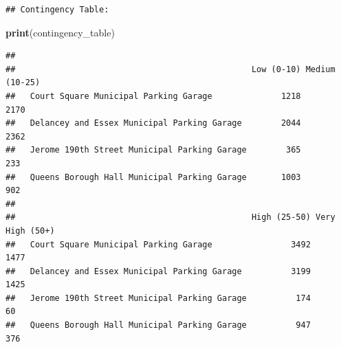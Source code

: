 \documentclass[
  12pt,
]{article}
\newenvironment{Shaded}{\begin{snugshade}}{\end{snugshade}}
\newcommand{\FunctionTok}[1]{\textcolor[rgb]{0.13,0.29,0.53}{\textbf{#1}}}
\newcommand{\NormalTok}[1]{#1}
\begin{document}
\begin{verbatim}
## Contingency Table:
\end{verbatim}

\begin{Shaded}
\begin{Highlighting}[]
\FunctionTok{print}\NormalTok{(contingency\_table)}
\end{Highlighting}
\end{Shaded}

\begin{verbatim}
##                                               
##                                                Low (0-10) Medium (10-25)
##   Court Square Municipal Parking Garage              1218           2170
##   Delancey and Essex Municipal Parking Garage        2044           2362
##   Jerome 190th Street Municipal Parking Garage        365            233
##   Queens Borough Hall Municipal Parking Garage       1003            902
##                                               
##                                                High (25-50) Very High (50+)
##   Court Square Municipal Parking Garage                3492            1477
##   Delancey and Essex Municipal Parking Garage          3199            1425
##   Jerome 190th Street Municipal Parking Garage          174              60
##   Queens Borough Hall Municipal Parking Garage          947             376
\end{verbatim}
\end{document}
